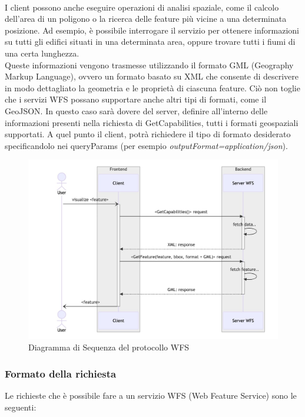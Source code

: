 \\I client possono anche eseguire operazioni di analisi spaziale, come il calcolo dell'area di un poligono o la ricerca delle feature più vicine a una determinata posizione.
Ad esempio, è possibile interrogare il servizio per ottenere informazioni su tutti gli edifici situati in una determinata area, oppure trovare tutti i fiumi di una certa lunghezza.
\\Queste informazioni vengono trasmesse utilizzando il formato GML (Geography Markup Language), ovvero un formato basato su XML che consente di descrivere in modo dettagliato la geometria e le proprietà di ciascuna feature. Ciò non toglie che i servizi WFS possano supportare anche altri tipi di formati, come il GeoJSON. In questo caso sarà dovere del server, definire all'interno delle informazioni presenti nella richiesta di GetCapabilities, tutti i formati geospaziali supportati. A quel punto il client, potrà richiedere il tipo di formato desiderato specificandolo nei queryParams (per esempio \textit{outputFormat=application/json}).

\begin{figure}[htbp]
      \centering
      \includegraphics[width=1\textwidth]{images/Capitolo2/ProtocolWFS.jpg}
      \caption{Diagramma di Sequenza del protocollo WFS}
      \label{fig:wfs protocol}
\end{figure}

\subsubsection{Formato della richiesta}

Le richieste che è possibile fare a un servizio WFS (Web Feature Service) sono le seguenti:

